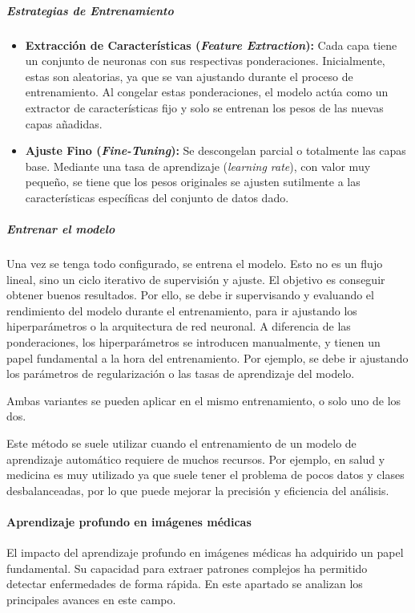 \documentclass[11pt, a4paper]{article}
\numberwithin{equation}{section}
\begin{document}
\subparagraph{Estrategias de Entrenamiento}

\begin{itemize}
\item \textbf{Extracción de Características (\textit{Feature Extraction}):} Cada capa tiene un conjunto de neuronas con sus respectivas ponderaciones. Inicialmente, estas son aleatorias, ya que se van ajustando durante el proceso de entrenamiento. Al congelar estas ponderaciones, el modelo actúa como un extractor de características fijo y solo se entrenan los pesos de las nuevas capas añadidas.

\item \textbf{Ajuste Fino (\textit{Fine-Tuning}):} Se descongelan parcial o totalmente las capas base. Mediante una tasa de aprendizaje (\textit{learning rate}), con valor muy pequeño, se tiene que los pesos originales se ajusten sutilmente a las características específicas del conjunto de datos dado.
\end{itemize}

\subparagraph{Entrenar el modelo}

Una vez se tenga todo configurado, se entrena el modelo. Esto no es un flujo lineal, sino un ciclo iterativo de supervisión y ajuste. El objetivo es conseguir obtener buenos resultados. Por ello, se debe ir supervisando y evaluando el rendimiento del modelo durante el entrenamiento, para ir ajustando los hiperparámetros o la arquitectura de red neuronal. A diferencia de las ponderaciones, los hiperparámetros se introducen manualmente, y tienen un papel fundamental a la hora del entrenamiento. Por ejemplo, se debe ir ajustando los parámetros de regularización o las tasas de aprendizaje del modelo.

Ambas variantes se pueden aplicar en el mismo entrenamiento, o solo uno de los dos.

Este método se suele utilizar cuando el entrenamiento de un modelo de aprendizaje automático requiere de muchos recursos. Por ejemplo, en salud y medicina es muy utilizado ya que suele tener el problema de pocos datos y clases desbalanceadas, por lo que puede mejorar la precisión y eficiencia del análisis.

\paragraph{Aprendizaje profundo en imágenes médicas}
\label{subsub:dl_imagenes_medicas}

El impacto del aprendizaje profundo en imágenes médicas ha adquirido un papel fundamental. Su capacidad para extraer patrones complejos ha permitido detectar enfermedades de forma rápida. En este apartado se analizan los principales avances en este campo.
\end{document}
